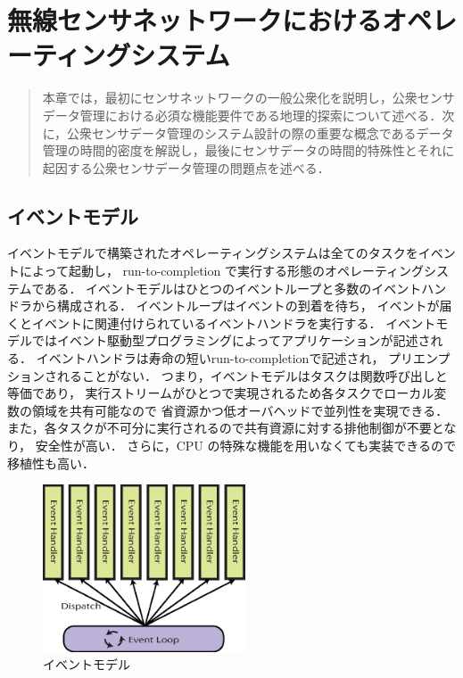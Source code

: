 \chapter{無線センサネットワークにおけるオペレーティングシステム}
\begin{large}
\begin{quote}
本章では，最初にセンサネットワークの一般公衆化を説明し，公衆センサデータ管理における必須な機能要件である地理的探索について述べる．次に，公衆センサデータ管理のシステム設計の際の重要な概念であるデータ管理の時間的密度を解説し，最後にセンサデータの時間的特殊性とそれに起因する公衆センサデータ管理の問題点を述べる．
\end{quote}
\end{large}
\clearpage



\section{イベントモデル}
イベントモデルで構築されたオペレーティングシステムは全てのタスクをイベントによって起動し，
run-to-completion で実行する形態のオペレーティングシステムである．
イベントモデルはひとつのイベントループと多数のイベントハンドラから構成される．
イベントループはイベントの到着を待ち，
イベントが届くとイベントに関連付けられているイベントハンドラを実行する．
イベントモデルではイベント駆動型プログラミングによってアプリケーションが記述される．
イベントハンドラは寿命の短いrun-to-completionで記述され，
プリエンプションされることがない．
つまり，イベントモデルはタスクは関数呼び出しと等価であり，
実行ストリームがひとつで実現されるため各タスクでローカル変数の領域を共有可能なので
省資源かつ低オーバヘッドで並列性を実現できる．
また，各タスクが不可分に実行されるので共有資源に対する排他制御が不要となり，
安全性が高い．
さらに，CPU の特殊な機能を用いなくても実装できるので移植性も高い．
\begin{figure}[htbp]
 \begin{center}
  \includegraphics[width=60mm]{./images/event_model.eps}
 \end{center}
 \caption{イベントモデル}
 \label{fig:event_model}
\end{figure}


